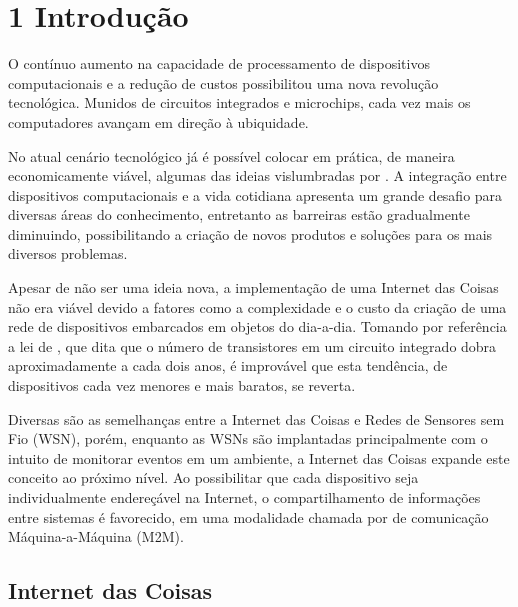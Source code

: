 \documentclass[twoside,english,brazilian]{UNISINOSmonografia}
\begin{document}
\chapter{1 Introdução}

{}

	O contínuo aumento na capacidade de processamento de dispositivos computacionais e a redução de custos possibilitou uma nova revolução tecnológica. Munidos de circuitos integrados e microchips, cada vez mais os computadores avançam em direção à ubiquidade.
	
	No atual cenário tecnológico já é possível colocar em prática, de maneira economicamente viável, algumas das ideias vislumbradas por . A integração entre dispositivos computacionais e a vida cotidiana apresenta um grande desafio para diversas áreas do conhecimento, entretanto as barreiras estão gradualmente diminuindo, possibilitando a criação de novos produtos e soluções para os mais diversos problemas.
	
	Apesar de não ser uma ideia nova, a implementação de uma Internet das 
	Coisas não era viável devido a fatores como a complexidade e o custo da 
	criação de uma rede de dispositivos embarcados em objetos do dia-a-dia. 
	Tomando por referência a lei de , que dita que o 
	número de transistores em um circuito integrado dobra aproximadamente a 
	cada dois anos, é improvável que esta tendência, de dispositivos cada vez 
	menores e mais baratos, se reverta.
	
	Diversas são as semelhanças entre a Internet das Coisas e Redes de 
	Sensores sem Fio (WSN), porém, enquanto as WSNs \cite{Sakthidharan2012} 
	são implantadas principalmente com o intuito de monitorar eventos em um 
	ambiente, a Internet das Coisas expande este conceito ao próximo nível. Ao 
	possibilitar que cada dispositivo seja individualmente endereçável na 
	Internet, o compartilhamento de informações entre sistemas é favorecido, 
	em uma modalidade chamada por  de comunicação 
	Máquina-a-Máquina (M2M).

	\section{Internet das Coisas}
	
\end{document}
